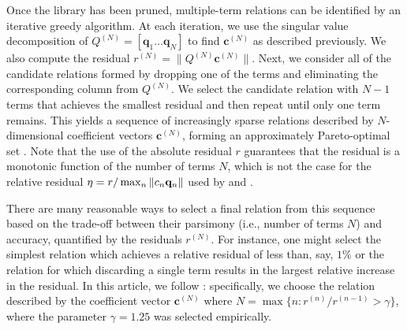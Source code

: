 \documentclass[preprint]{article}
\def\bi#1{\textbf{#1}}
\def\mx#1{#1}
\begin{document}


Once the library has been pruned, multiple-term relations can %
be identified by an iterative greedy algorithm. At each iteration, we use the singular value decomposition of $\mx{Q}^{(N)} = [{\bi q}_1 \dots {\bi q}_N]$ to find ${\bi c}^{(N)}$ as described previously. We also compute the residual $r^{(N)} = \|\mx{Q}^{(N)} {\bi c}^{(N)}\|$. Next, we consider all of the candidate relations formed by dropping one of the terms and eliminating the corresponding column from $\mx{Q}^{(N)}$. We select the candidate relation with $N-1$ terms that achieves the smallest residual and then repeat until only one term remains. This yields a sequence of increasingly sparse relations described by $N$-dimensional coefficient vectors ${\bi c}^{(N)}$, forming an approximately Pareto-optimal set \citep{miettinen2012}. Note that the use of the absolute residual $r$ guarantees that the residual is a monotonic function of the number of terms $N$, which is not the case for the relative residual $\eta=r/\max_n\|c_n{\bf q}_n\|$ used by \citet{reinbold2021} and \citet{golden2023}.

There are many reasonable ways to select a final relation from this sequence based on the trade-off between their parsimony (i.e., number of terms $N$) and accuracy, quantified by the residuals $r^{(N)}$. For instance, one might select the simplest relation which achieves a relative residual of less than, say, $1\%$ or the relation for which discarding a single term results in the largest relative increase in the residual. In this article, we follow \citet{gurevich2019}: specifically, we choose the relation described by the coefficient vector ${\bi c}^{(N)}$ where $N = \max\{n : r^{(n)}/r^{(n-1)} > \gamma\}$, where the parameter $\gamma = 1.25$ was selected empirically.
\end{document}
